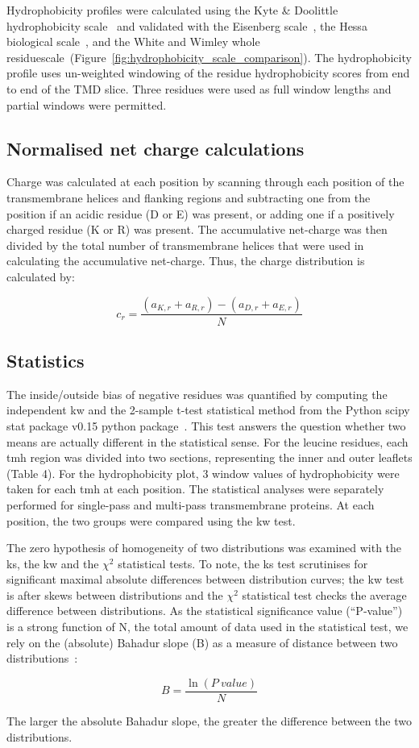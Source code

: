 Hydrophobicity profiles were calculated using the Kyte \& Doolittle hydrophobicity scale~\cite{Kyte1982} and validated with the Eisenberg scale~\cite{Eisenberg1984}, the Hessa biological scale~\cite{Hessa2005}, and the White and Wimley whole residuescale~\cite{White1999}(Figure~\ref{fig:hydrophobicity_scale_comparison}).
The hydrophobicity profile uses un-weighted windowing of the residue hydrophobicity scores from end to end of the TMD slice.
Three residues were used as full window lengths and partial windows were permitted.

\subsection{Normalised net charge calculations}

Charge was calculated at each position by scanning through each position of the transmembrane helices and flanking regions and subtracting one from the position if an acidic residue (D or E) was present, or adding one if a positively charged residue (K or R) was present.
The accumulative net-charge  was then divided by the total number  of transmembrane helices that were used in calculating the accumulative net-charge.
Thus, the charge distribution is calculated by:

\begin{equation} \label{eq:charge_equation}
c_r=\frac{(a_{K,r}+a_{R,r})-(a_{D,r}+a_{E,r})}{N}
\end{equation}

\subsection{Statistics}

The inside/outside bias of negative residues was quantified by computing the independent \gls{kw} and the 2-sample t-test statistical method from the Python scipy stat package v0.15 python package~\cite{VanderWalt2011}.
This test answers the question whether two means are actually different in the statistical sense.
For the leucine residues, each \gls{tmh} region was divided into two sections, representing the inner and outer leaflets (Table 4).
 For the hydrophobicity plot, 3 window values of hydrophobicity were taken for each \gls{tmh} at each position.
The statistical analyses were separately performed for single-pass and multi-pass transmembrane proteins.
At each position, the two groups were compared using the \gls{kw} test.

The zero hypothesis of homogeneity of two distributions was examined with the \gls{ks}, the \gls{kw} and the \({\chi}^{2}\) statistical tests.
To note, the \gls{ks} test scrutinises for significant maximal absolute differences between distribution curves; the \gls{kw} test is after skews between distributions and the \({\chi}^{2}\) statistical test checks the average difference between distributions.
As the statistical significance value (``P‑value'') is a strong function of N, the total amount of data used in the statistical test, we rely on the (absolute) Bahadur slope (B) as a measure of distance between two distributions~\cite{Bahadur1967, Bahadur1971}:

\begin{equation} \label{eq:bahadur}
B=\frac{\ln(P~value)}{N}
\end{equation}

The larger the absolute Bahadur slope, the greater the difference between the two distributions.

